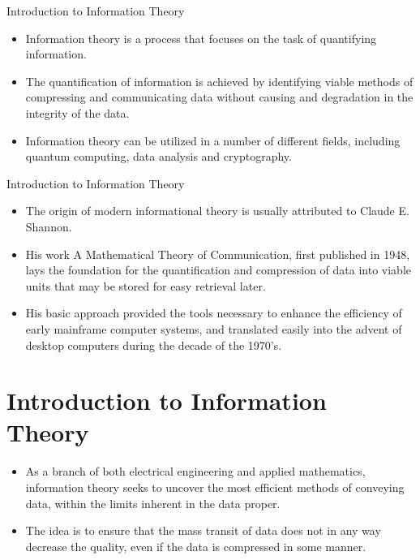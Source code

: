 
{Introduction to Information Theory}
\begin{itemize}
\item Information theory is a process that focuses on the task of quantifying information. 
\item The quantification of information is achieved by identifying viable methods of compressing and communicating data without causing 
and degradation in the integrity of the data. 
\item Information theory can be utilized in a number of different fields, including quantum computing, 
data analysis and cryptography.
\end{itemize}


{Introduction to Information Theory}
\begin{itemize}
\item The origin of modern informational theory is usually attributed to Claude E. Shannon.
\item His work A Mathematical Theory of Communication, first published in 1948, 
lays the foundation for the quantification and compression of data into viable units that may be stored for easy retrieval later. 
\item His basic approach provided the tools necessary to enhance the efficiency of early mainframe computer systems, and translated easily into 
the advent of desktop computers during the decade of the 1970’s.
\end{itemize}


\section{Introduction to Information Theory}
\begin{itemize}

\item As a branch of both electrical engineering and applied mathematics, information theory seeks to uncover the most efficient 
methods of conveying data, within the limits inherent in the data proper. \item The idea is to ensure that the mass transit of data does 
not in any way decrease the quality, even if the data is compressed in some manner. 
\end{itemize}

